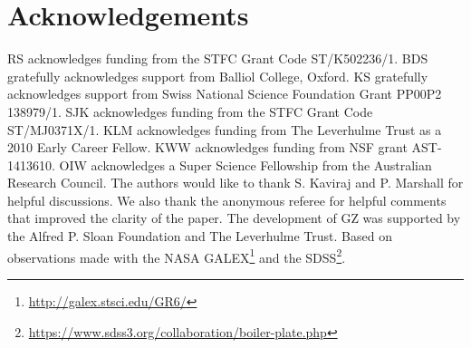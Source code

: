\documentclass[useAMS,usenatbib]{mn2e}
\begin{document}
\section*{Acknowledgements}

RS acknowledges funding from the STFC Grant Code ST/K502236/1. BDS gratefully acknowledges support from Balliol College, Oxford. KS gratefully acknowledges support from Swiss National Science Foundation Grant PP00P2 138979/1. SJK acknowledges funding from the STFC Grant Code ST/MJ0371X/1. KLM acknowledges funding from The Leverhulme Trust as a 2010 Early Career Fellow. KWW acknowledges funding from NSF grant AST-1413610. OIW acknowledges a Super Science Fellowship from the Australian Research Council. The authors would like to thank S. Kaviraj and P. Marshall for helpful discussions. We also thank the anonymous referee for helpful comments that improved the clarity of the paper. The development of GZ was supported by the Alfred P. Sloan Foundation and The Leverhulme Trust. Based on observations made with the NASA GALEX\footnote{\url{http://galex.stsci.edu/GR6/}} and the SDSS\footnote{\url{https://www.sdss3.org/collaboration/boiler-plate.php}}.

\end{document}
